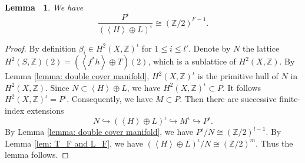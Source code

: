 \documentclass[12pt,reqno,a4paper]{amsart}
\newtheorem{lem}[thm]{Lemma~}
\theoremstyle{remark}
\theoremstyle{definition}
\newcommand{\ZZ}{\mathbb{Z}}
\begin{document}
\begin{lem}
\label{lem: saturation of inv part of P}
    We have
    \begin{equation*}
        \frac{P^{\iota}}{(\left\langle H \right\rangle\oplus L)^{\iota}} \cong (\ZZ/2)^{l'-1}.
    \end{equation*}
\end{lem}
\begin{proof}
By definition $\beta_i\in H^2(X, \ZZ)^\iota$ for $1\le i\le l'$. 
Denote by $N$ the lattice $H^2(S,\ZZ)(2)=(\left\langle f^*h \right\rangle \oplus T)(2)$, which is a sublattice of $H^2(X, \ZZ)$.
By Lemma \ref{lemma: double cover manifold}, $H^2(X,\ZZ)^{\iota}$ is the primitive hull of $N$ in $H^2(X, \ZZ)$.
Since $N\subset \left\langle H\right\rangle \oplus L$, we have $H^2(X,\ZZ)^{\iota}\subset P$. It follows $H^2(X,\ZZ)^{\iota}=P^\iota$.
Consequently, we have $M\subset P$.
Then there are successive finite-index extensions
\begin{equation}
\label{eqn: iota-invariant successive saturations}
    N \hookrightarrow (\left\langle H \right\rangle\oplus L)^{\iota} \hookrightarrow M^{\iota} \hookrightarrow P^{\iota}.
\end{equation}
By Lemma \ref{lemma: double cover manifold}, we have $P^{\iota} / N\cong (\ZZ/2)^{l-1}$.
By Lemma \ref{lem: T_F and L_F}, we have $(\left\langle H \right\rangle\oplus L)^{\iota}/N \cong (\ZZ/2)^{m}$. 
Thus the lemma follows.
\end{proof}
\end{document}
